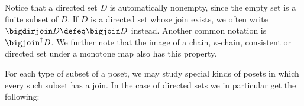 Notice that a directed set $D$ is automatically nonempty, since the empty set is a finite subset of $D$. If $D$ is a directed set whose join exists, we often write $\bigdirjoin D \defeq \bigjoin D$ instead. Another common notation is $\bigjoin^\uparrow D$. We further note that the image of a chain, $\kappa$-chain, consistent or directed set under a monotone map also has this property.

For each type of subset of a poset, we may study special kinds of posets in which every such subset has a join. In the case of directed sets we in particular get the following:

